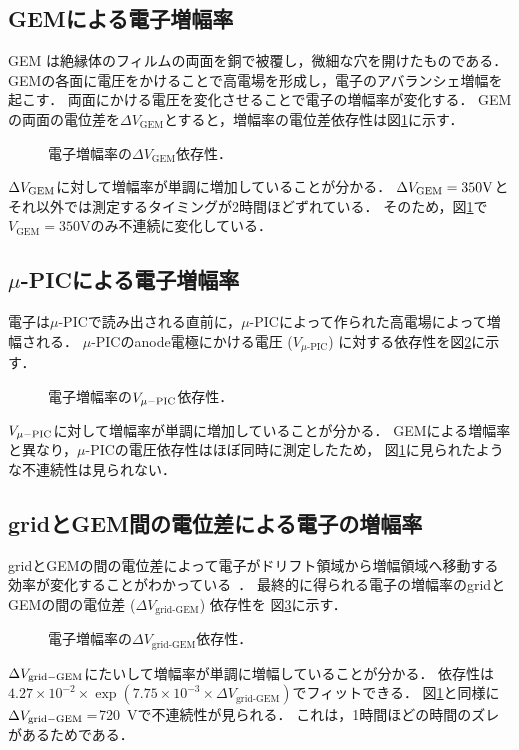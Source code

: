 \documentclass[../master]{subfiles}
\begin{document}
\subsection{GEMによる電子増幅率}
GEM は絶縁体のフィルムの両面を銅で被覆し，微細な穴を開けたものである．
GEMの各面に電圧をかけることで高電場を形成し，電子のアバランシェ増幅を起こす．
両面にかける電圧を変化させることで電子の増幅率が変化する．
GEMの両面の電位差を$\Delta V_{\text{GEM}}$とすると，増幅率の電位差依存性は図\ref{fig::gain_GEM_V_dep}に示す．
\begin{figure}
  \centering
  \scalebox{0.7}{}
  \caption{電子増幅率の$\Delta V_{\text{GEM}}$依存性．}
  \label{fig::gain_GEM_V_dep}
\end{figure}
$\Delta V_{\rm GEM}$に対して増幅率が単調に増加していることが分かる．
$\Delta V_{\rm GEM} = 350 {\rm V}$とそれ以外では測定するタイミングが2時間ほどずれている．
そのため，図\ref{fig::gain_GEM_V_dep}で$V_{\text{GEM}} = 350 {\text{V}}$のみ不連続に変化している．

\subsection{$\mu$-PICによる電子増幅率}
電子は$\mu$-PICで読み出される直前に，$\mu$-PICによって作られた高電場によって増幅される．
$\mu$-PICのanode電極にかける電圧 ($V_{\mu\text{-PIC}}$) に対する依存性を図\ref{fig::gain_uPIC_V_dep}に示す．
\begin{figure}
  \centering
  \scalebox{0.7}{}
  \caption{電子増幅率の$V_{\rm\mu-PIC}$依存性．}
  \label{fig::gain_uPIC_V_dep}
\end{figure}
$V_{\rm\mu-PIC}$に対して増幅率が単調に増加していることが分かる．
GEMによる増幅率と異なり，$\mu$-PICの電圧依存性はほぼ同時に測定したため，
図\ref{fig::gain_GEM_V_dep}に見られたような不連続性は見られない．

\subsection{gridとGEM間の電位差による電子の増幅率}
gridとGEMの間の電位差によって電子がドリフト領域から増幅領域へ移動する効率が変化することがわかっている~\cite{furuno}．
最終的に得られる電子の増幅率のgridとGEMの間の電位差 ($\Delta V_{\text{grid-GEM}}$) 依存性を
図\ref{fig::gain_grid_GEM_V_dep}に示す．
\begin{figure}
  \centering
  \scalebox{0.7}{}
  \caption{電子増幅率の$\Delta V_{\text{grid-GEM}}$依存性．}
  \label{fig::gain_grid_GEM_V_dep}
\end{figure}
$\Delta V_{\rm grid-GEM}$にたいして増幅率が単調に増幅していることが分かる．
依存性は$4.27\times 10^{-2}\times \exp(7.75\times 10^{-3}\times \Delta V_{\text{grid-GEM}})$でフィットできる．
図\ref{fig::gain_GEM_V_dep}と同様に$\Delta V_{\rm grid-GEM} = $\SI{720}{\volt}で不連続性が見られる．
これは，1時間ほどの時間のズレがあるためである．
\end{document}
